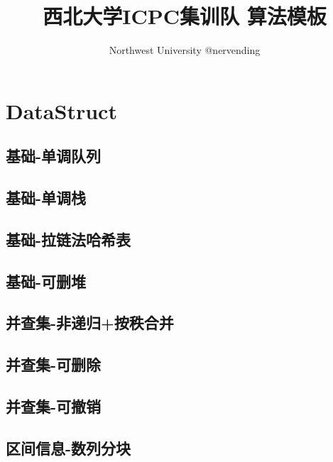 \documentclass[UTF8]{ctexart}
\title{西北大学ICPC集训队 算法模板}
\author{Northwest University @nervending}
\begin{document}
\begin{CJK}{UTF8}{<font>}
\begin{spacing}{0.80}
\begin{multicols}{2}
\begin{titlepage}
\maketitle
\thispagestyle{empty}
\pagestyle{plain}
\tableofcontents
\end{titlepage}
\end{multicols}
\section{DataStruct}
\subsection{基础-单调队列} 
\subsection{基础-单调栈} 
\subsection{基础-拉链法哈希表} 
\subsection{基础-可删堆} 
\subsection{并查集-非递归+按秩合并} 
\subsection{并查集-可删除} 
\subsection{并查集-可撤销} 
\subsection{区间信息-数列分块} 

\end{spacing}
\end{CJK}
\end{document}
